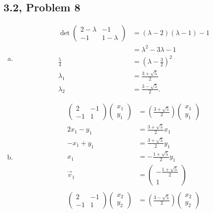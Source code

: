 \documentclass[10pt]{mypackage}
\begin{document}
\subsection{3.2, Problem 8}%
\begin{enumerate}[(a)]
  \item 
    \begin{align*}
      \det \begin{pmatrix}2-\lambda & -1 \\ -1 & 1-\lambda\end{pmatrix} &= \left(\lambda - 2\right)\left(\lambda -1\right) - 1\\
                                    &= \lambda^2 - 3\lambda - 1\\
                       \frac{5}{4} &= \left(\lambda - \frac{3}{2}\right)^2\\
                       \lambda_1 &= \frac{3 + \sqrt{5}}{2}\\
                       \lambda_2 &= \frac{3-\sqrt{5}}{2}.
    \end{align*}
  \item 
    \begin{align*}
      \begin{pmatrix}2 & -1 \\ -1 & 1\end{pmatrix} \begin{pmatrix}x_1\\y_1\end{pmatrix} &= \left(\frac{3 + \sqrt{5}}{2}\right) \begin{pmatrix}x_1\\y_1\end{pmatrix}\\
      2x_1 - y_1 &= \frac{3+\sqrt{5}}{2}x_1\\
      -x_1 + y_1 &= \frac{3+\sqrt{5}}{2}y_1\\
      x_1 &= -\frac{1+\sqrt{5}}{2}y_1\\
      \vec{v}_1 &= \begin{pmatrix}-\frac{1+\sqrt{5}}{2}\\ 1\end{pmatrix}\\
      \\
      \begin{pmatrix}2 & -1 \\ -1 & 1\end{pmatrix} \begin{pmatrix}x_2\\y_2\end{pmatrix} &= \left(\frac{3 - \sqrt{5}}{2}\right) \begin{pmatrix}x_2\\y_2\end{pmatrix}\\

\end{align*}
\end{enumerate}
\end{document}
